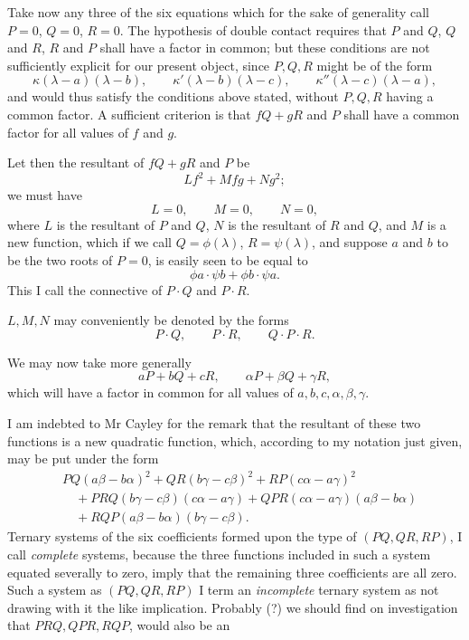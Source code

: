 \documentclass[11pt]{article}
\newcommand{\sourcepage}[1]{\marginpar{\scriptsize p.~#1}}
\begin{document}
\sourcepage{130}
Take now any three of the six equations which for the sake of generality call $P=0$, $Q=0$, $R=0$. The hypothesis of double contact requires that $P$ and $Q$, $Q$ and $R$, $R$ and $P$ shall have a factor in common; but these conditions are not sufficiently explicit for our present object, since $P,Q,R$ might be of the form
\[
\kappa(\lambda-a)(\lambda-b),\qquad
\kappa'(\lambda-b)(\lambda-c),\qquad
\kappa''(\lambda-c)(\lambda-a),
\]
and would thus satisfy the conditions above stated, without $P,Q,R$ having a common factor. A sufficient criterion is that $fQ+gR$ and $P$ shall have a common factor for all values of $f$ and $g$.

Let then the resultant of $fQ+gR$ and $P$ be
\[
Lf^2+Mfg+Ng^2;
\]
we must have
\[
L=0,\qquad M=0,\qquad N=0,
\]
where $L$ is the resultant of $P$ and $Q$, $N$ is the resultant of $R$ and $Q$, and $M$ is a new function, which if we call $Q=\phi(\lambda)$, $R=\psi(\lambda)$, and suppose $a$ and $b$ to be the two roots of $P=0$, is easily seen to be equal to
\[
\phi a\cdot\psi b+\phi b\cdot\psi a.
\]
This I call the connective of $P\cdot Q$ and $P\cdot R$.

$L,M,N$ may conveniently be denoted by the forms
\[
P\cdot Q,\qquad P\cdot R,\qquad Q\cdot P\cdot R.
\]

We may now take more generally
\[
aP+bQ+cR,\qquad
\alpha P+\beta Q+\gamma R,
\]
which will have a factor in common for all values of $a,b,c,\alpha,\beta,\gamma$.

I am indebted to Mr Cayley for the remark that the resultant of these two functions is a new quadratic function, which, according to my notation just given, may be put under the form
\[
\begin{aligned}
&PQ(a\beta-b\alpha)^2+QR(b\gamma-c\beta)^2+RP(c\alpha-a\gamma)^2\\
&\quad+PRQ(b\gamma-c\beta)(c\alpha-a\gamma)
+QPR(c\alpha-a\gamma)(a\beta-b\alpha)\\
&\quad+RQP(a\beta-b\alpha)(b\gamma-c\beta).
\end{aligned}
\]
Ternary systems of the six coefficients formed upon the type of $(PQ,QR,RP)$, I call \emph{complete} systems, because the three functions included in such a system equated severally to zero, imply that the remaining three coefficients are all zero. Such a system as $(PQ,QR,RP)$ I term an \emph{incomplete} ternary system as not drawing with it the like implication. Probably (?) we should find on investigation that $PRQ,QPR,RQP$, would also be an
\end{document}
